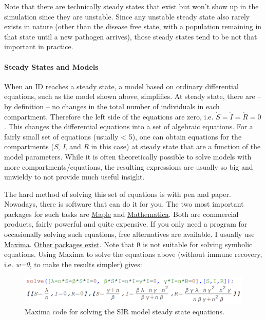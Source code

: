 \documentclass[]{article}
\let\oldparagraph\paragraph
\renewcommand{\paragraph}[1]{\oldparagraph{#1}\mbox{}}
\theoremstyle{definition}
\theoremstyle{definition}
\theoremstyle{definition}
\theoremstyle{remark}
\begin{document}
Note that there are technically steady states that exist but won't show
up in the simulation since they are unstable. Since any unstable steady
state also rarely exists in nature (other than the disease free state,
with a population remaining in that state until a new pathogen arrives),
those steady states tend to be not that important in practice.

\paragraph{Steady States and Models}\label{myadvancedbox}

When an ID reaches a steady state, a model based on ordinary
differential equations, such as the model shown above, simplifies. At
steady state, there are -- by definition -- no changes in the total
number of individuals in each compartment. Therefore the left side of
the equations are zero, i.e. \(\dot S = \dot I = \dot R =0\). This
changes the differential equations into a set of algebraic equations.
For a fairly small set of equations (usually \textless{} 5), one can
obtain equations for the compartments (\emph{S}, \emph{I}, and \emph{R}
in this case) at steady state that are a function of the model
parameters. While it is often theoretically possible to solve models
with more compartments/equations, the resulting expressions are usually
so big and unwieldy to not provide much useful insight.

The hard method of solving this set of equations is with pen and paper.
Nowadays, there is software that can do it for you. The two most
important packages for such tasks are
\href{http://www.maplesoft.com/}{Maple} and
\href{https://www.wolfram.com/mathematica/}{Mathematica}. Both are
commercial products, fairly powerful and quite expensive. If you only
need a program for occasionally solving such equations, free
alternatives are available. I usually use
\href{http://maxima.sourceforge.net/}{Maxima}.
\href{http://en.wikipedia.org/wiki/Comparison_of_computer_algebra_systems}{Other
packages exist}. Note that \texttt{R} is not suitable for solving
symbolic equations. Using Maxima to solve the equations above (without
immune recovery, i.e. \emph{w=0}, to make the results simpler) gives:

\begin{figure}
\centering
\includegraphics{./images/SSmaxima.png}
\caption{Maxima code for solving the SIR model steady state equations.}
\end{figure}
\end{document}
